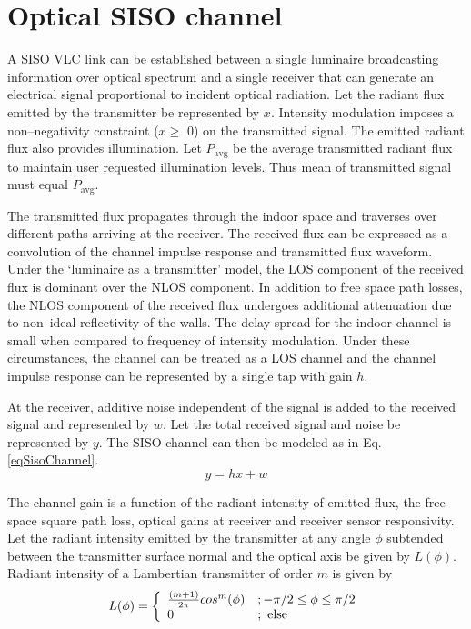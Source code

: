 \section{Optical SISO channel}
\label{sec:sisoChannel}
\graphicspath{{_SISO/Figures/}}

A SISO VLC link can be established between a single luminaire broadcasting information over optical spectrum  and a single receiver that can generate an electrical signal proportional to incident optical radiation. Let the radiant flux emitted by the transmitter be represented by $x$. Intensity modulation imposes a non--negativity constraint ($x\geq$ 0) on the transmitted signal. The emitted radiant flux also provides illumination. Let $P_{\text{avg}}$ be the average transmitted radiant flux to maintain user requested illumination levels. Thus mean of transmitted signal must equal $P_{\text{avg}}$.

The transmitted flux propagates through the indoor space and traverses over different paths arriving at the receiver. The received flux can be expressed as a convolution of the channel impulse response and transmitted flux waveform. Under the `luminaire as a transmitter' model, the LOS component of the received flux is dominant over the NLOS component. In addition to free space path losses, the NLOS component of the received flux undergoes additional attenuation due to non--ideal reflectivity of the walls. The delay spread for the indoor channel is small when compared to frequency of intensity modulation. Under these circumstances, the channel can be treated as a LOS channel and the channel impulse response can be represented by a single tap with gain $h$. 

At the receiver, additive noise independent of the signal is added to the received signal and represented by $w$. Let the total received signal and noise be represented by $y$. The SISO channel can then be modeled as in Eq. \eqref{eqSisoChannel}.
\begin{equation}
	\label{eqSisoChannel}
	y = hx + w
\end{equation}

The channel gain is a function of the radiant intensity of emitted flux, the free space square path loss, optical gains at receiver and receiver sensor responsivity. Let the radiant intensity emitted by the transmitter at any angle $\phi$ subtended between the transmitter surface normal and the optical axis be given by $L(\phi)$. Radiant intensity of a Lambertian transmitter of order $m$ is given by
\begin{equation}
	\label{eqLambertian}
	L(\phi) = \left\{ \begin{array}{ll} {\frac{(m+1)}{2\pi}}cos^{m}(\phi) &; -\pi/2\leq\phi\leq\pi/2 \\ 0 &; \mbox{ else} \end{array} \right.
\end{equation}

